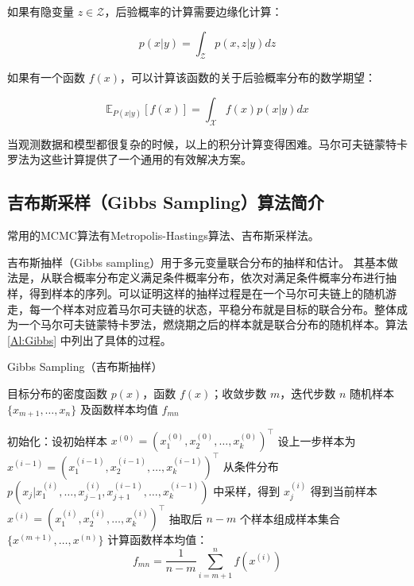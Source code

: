 \documentclass[AutoFakeBold]{LZUThesis}
\newcommand{\scite}[1]{\textsuperscript{\cite{#1}}}
\begin{document}
如果有隐变量 $z \in \mathcal{Z}$，后验概率的计算需要边缘化计算：

\begin{equation}
	p(x|y) = \int_{\mathcal{Z}} p(x, z|y) dz \label{Equation:marginalization}
\end{equation}

如果有一个函数 $f(x)$，可以计算该函数的关于后验概率分布的数学期望：

\begin{equation}
	\mathbb{E}_{P(x|y)}[f(x)] = \int_{\mathcal{X}} f(x) p(x|y) dx \label{Equation:expectation}
\end{equation}

当观测数据和模型都很复杂的时候，以上的积分计算变得困难。马尔可夫链蒙特卡罗法为这些计算提供了一个通用的有效解决方案。

\subsection{吉布斯采样（Gibbs Sampling）算法简介\scite{李航2019统计学习方法}}
常用的MCMC算法有Metropolis-Hastings算法、吉布斯采样法。

吉布斯抽样（Gibbs sampling）用于多元变量联合分布的抽样和估计。 其基本做法是，从联合概率分布定义满足条件概率分布，依次对满足条件概率分布进行抽样，得到样本的序列。可以证明这样的抽样过程是在一个马尔可夫链上的随机游走，每一个样本对应着马尔可夫链的状态，平稳分布就是目标的联合分布。整体成为一个马尔可夫链蒙特卡罗法，燃烧期之后的样本就是联合分布的随机样本。算法 \ref{Al:Gibbs} 中列出了具体的过程。
\begin{algorithm}[H]
	\caption{Gibbs Sampling（吉布斯抽样）}
	\label{Al:Gibbs}
	\begin{algorithmic}[1]
		\Require 目标分布的密度函数 $p(x)$，函数 $f(x)$；收敛步数 $m$，迭代步数 $n$
		\Ensure 随机样本 $\{x_{m+1}, \dots, x_n\}$ 及函数样本均值 $f_{mn}$
		
		\State 初始化：设初始样本 $x^{(0)} = (x_1^{(0)}, x_2^{(0)}, \dots, x_k^{(0)})^\top$
		\State 设上一步样本为 $x^{(i-1)} = (x_1^{(i-1)}, x_2^{(i-1)}, \dots, x_k^{(i-1)})^\top$
		\State 从条件分布 $p(x_j | x_1^{(i)}, \dots, x_{j-1}^{(i)}, x_{j+1}^{(i-1)}, \dots, x_k^{(i-1)})$ 中采样，得到 $x_j^{(i)}$
		\EndFor
		\State 得到当前样本 $x^{(i)} = (x_1^{(i)}, x_2^{(i)}, \dots, x_k^{(i)})^\top$
		\EndFor
		\State 抽取后 $n - m$ 个样本组成样本集合 $\{x^{(m+1)}, \dots, x^{(n)}\}$
		\State 计算函数样本均值：
		\[
		f_{mn} = \frac{1}{n - m} \sum_{i = m+1}^{n} f(x^{(i)})
		\]
	\end{algorithmic}
\end{algorithm}	
\end{document}
